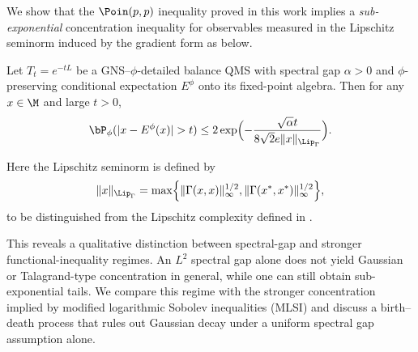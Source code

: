 \documentclass[sn-mathphys-num]{sn-jnl}
\begin{document}
We show that the $\Poin(p,p)$ inequality proved in this work implies a
\emph{sub-exponential} concentration inequality for observables measured in the
Lipschitz seminorm induced by the gradient form as below.
\begin{cor*}
Let $T_t=e^{-tL}$ be a GNS--$\phi$-detailed balance QMS with spectral gap $\alpha>0$ and $\phi$-preserving conditional expectation $E^\phi$ onto its fixed-point algebra. Then for any $x\in\M$ and large $t>0$,
\[
\bP_{\phi}(|x-E^\phi(x)|>t)
\le
2\exp\Bigl(-\frac{\sqrt{\alpha} t}{8\sqrt{2}e \|x\|_{\Lip_\Gamma}}\Bigr).
\]
\end{cor*}
Here the Lipschitz seminorm is defined by
\[
\|x\|_{\Lip_\Gamma} = \max\Bigl\{\|\Gamma(x,x)\|_\infty^{1/2}, \|\Gamma(x^*,x^*)\|_\infty^{1/2}\Bigr\},
\]
to be distinguished from the Lipschitz complexity defined in \cite[eq.~(1.1)]{Araiza2026resourcedependent}.

This reveals a qualitative distinction between spectral-gap and stronger
functional-inequality regimes.
An $L^2$ spectral gap alone does not yield Gaussian or Talagrand-type concentration in general, while one can still obtain sub-exponential tails.
We compare this regime with the stronger concentration implied by modified logarithmic Sobolev inequalities (MLSI) and discuss a birth--death process  that rules out Gaussian decay under a uniform spectral gap assumption alone.
\end{document}
